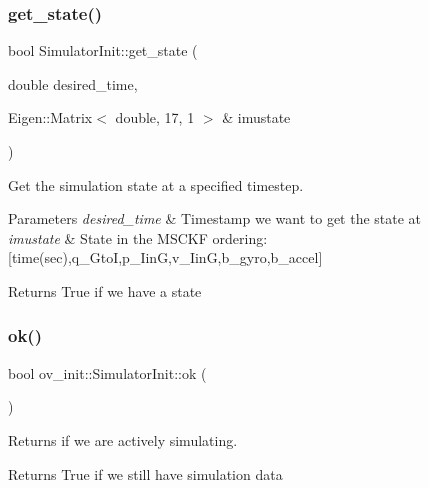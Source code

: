 \subsubsection{\texorpdfstring{get\+\_\+state()}{get\_state()}}
{\footnotesize\ttfamily bool Simulator\+Init\+::get\+\_\+state (\begin{DoxyParamCaption}\item[{double}]{desired\+\_\+time,  }\item[{Eigen\+::\+Matrix$<$ double, 17, 1 $>$ \&}]{imustate }\end{DoxyParamCaption})}



Get the simulation state at a specified timestep. 


\begin{DoxyParams}{Parameters}
{\em desired\+\_\+time} & Timestamp we want to get the state at \\
\hline
{\em imustate} & State in the M\+S\+C\+KF ordering\+: \mbox{[}time(sec),q\+\_\+\+GtoI,p\+\_\+\+IinG,v\+\_\+\+IinG,b\+\_\+gyro,b\+\_\+accel\mbox{]} \\
\hline
\end{DoxyParams}
\begin{DoxyReturn}{Returns}
True if we have a state 
\end{DoxyReturn}
\mbox{\label{classov__init_1_1SimulatorInit_a9a251dce8d062f3b152f9fa72a7f5dd1}} 
\subsubsection{\texorpdfstring{ok()}{ok()}}
{\footnotesize\ttfamily bool ov\+\_\+init\+::\+Simulator\+Init\+::ok (\begin{DoxyParamCaption}{ }\end{DoxyParamCaption})\hspace{0.3cm}{\ttfamily [inline]}}



Returns if we are actively simulating. 

\begin{DoxyReturn}{Returns}
True if we still have simulation data 
\end{DoxyReturn}
\mbox{\label{classov__init_1_1SimulatorInit_a34f9e98902032aeb2b695e1f72f56d15}} 
